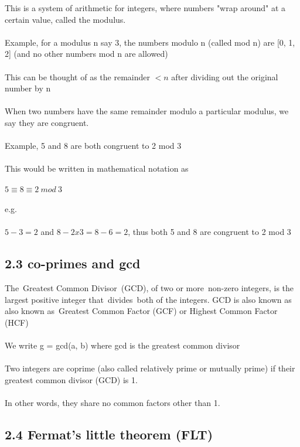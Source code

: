 \documentclass[11pt]{article}   	%
\begin{document}
This is a system of arithmetic for integers, where numbers "wrap around" at a certain value, called the modulus. \\
\\
Example, for a modulus n say 3, the numbers modulo n (called mod n) are [0, 1, 2] (and no other numbers mod n are allowed) \\
\\
This can be thought of as the remainder $ < n $ after dividing out the original number by n \\
\\
When two numbers have the same remainder modulo a particular modulus, we say they are congruent. \\
\\
Example, 5 and 8 are both congruent to 2 mod 3 \\
\\
This would be written in mathematical notation as \\
\\
$ 5 \equiv 8 \equiv 2 \ mod \ 3 $ \\
\\
e.g. \\
\\
$ 5 - 3 = 2 $ and $ 8 - 2x3 = 8 - 6 = 2 $, thus both 5 and 8 are congruent to 2 mod 3 \\


\subsection*{2.3 co-primes and gcd}

The Greatest Common Divisor (GCD), of two or more non-zero integers, is the largest positive integer that divides both of the integers. GCD is also known as also known as Greatest Common Factor (GCF) or Highest Common Factor (HCF) \\
\\
We write g = gcd(a, b) where gcd is the greatest common divisor \\
\\
Two integers are coprime (also called relatively prime or mutually prime) if their greatest common divisor (GCD) is 1. \\
\\
In other words, they share no common factors other than 1.


\subsection*{2.4 Fermat’s little theorem (FLT)}
\end{document}
